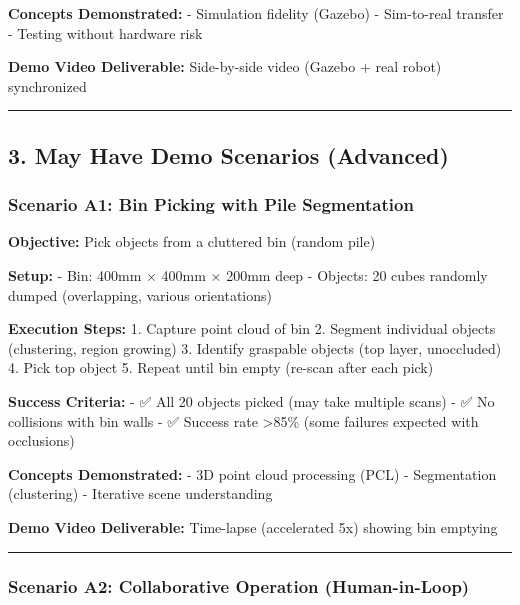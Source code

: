 \documentclass[
]{article}
\begin{document}
\textbf{Concepts Demonstrated:} - Simulation fidelity (Gazebo) -
Sim-to-real transfer - Testing without hardware risk

\textbf{Demo Video Deliverable:} Side-by-side video (Gazebo + real
robot) synchronized

\begin{center}\rule{0.5\linewidth}{0.5pt}\end{center}

\hypertarget{may-have-demo-scenarios-advanced}{%
\subsection{3. May Have Demo Scenarios
(Advanced)}\label{may-have-demo-scenarios-advanced}}

\hypertarget{scenario-a1-bin-picking-with-pile-segmentation}{%
\subsubsection{Scenario A1: Bin Picking with Pile
Segmentation}\label{scenario-a1-bin-picking-with-pile-segmentation}}

\textbf{Objective:} Pick objects from a cluttered bin (random pile)

\textbf{Setup:} - Bin: 400mm × 400mm × 200mm deep - Objects: 20 cubes
randomly dumped (overlapping, various orientations)

\textbf{Execution Steps:} 1. Capture point cloud of bin 2. Segment
individual objects (clustering, region growing) 3. Identify graspable
objects (top layer, unoccluded) 4. Pick top object 5. Repeat until bin
empty (re-scan after each pick)

\textbf{Success Criteria:} - ✅ All 20 objects picked (may take multiple
scans) - ✅ No collisions with bin walls - ✅ Success rate
\textgreater85\% (some failures expected with occlusions)

\textbf{Concepts Demonstrated:} - 3D point cloud processing (PCL) -
Segmentation (clustering) - Iterative scene understanding

\textbf{Demo Video Deliverable:} Time-lapse (accelerated 5x) showing bin
emptying

\begin{center}\rule{0.5\linewidth}{0.5pt}\end{center}

\hypertarget{scenario-a2-collaborative-operation-human-in-loop}{%
\subsubsection{Scenario A2: Collaborative Operation
(Human-in-Loop)}\label{scenario-a2-collaborative-operation-human-in-loop}}
\end{document}
